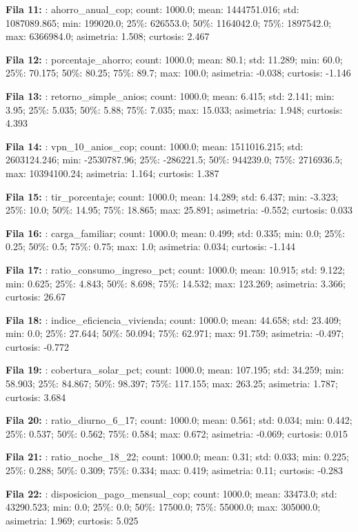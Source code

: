 {\footnotesize\textbf{Fila 11:} : ahorro\_anual\_cop; count: 1000.0; mean: 1444751.016; std: 1087089.865; min: 199020.0; 25\%: 626553.0; 50\%: 1164042.0; 75\%: 1897542.0; max: 6366984.0; asimetria: 1.508; curtosis: 2.467\par}
{\footnotesize\textbf{Fila 12:} : porcentaje\_ahorro; count: 1000.0; mean: 80.1; std: 11.289; min: 60.0; 25\%: 70.175; 50\%: 80.25; 75\%: 89.7; max: 100.0; asimetria: -0.038; curtosis: -1.146\par}
{\footnotesize\textbf{Fila 13:} : retorno\_simple\_anios; count: 1000.0; mean: 6.415; std: 2.141; min: 3.95; 25\%: 5.035; 50\%: 5.88; 75\%: 7.035; max: 15.033; asimetria: 1.948; curtosis: 4.393\par}
{\footnotesize\textbf{Fila 14:} : vpn\_10\_anios\_cop; count: 1000.0; mean: 1511016.215; std: 2603124.246; min: -2530787.96; 25\%: -286221.5; 50\%: 944239.0; 75\%: 2716936.5; max: 10394100.24; asimetria: 1.164; curtosis: 1.387\par}
{\footnotesize\textbf{Fila 15:} : tir\_porcentaje; count: 1000.0; mean: 14.289; std: 6.437; min: -3.323; 25\%: 10.0; 50\%: 14.95; 75\%: 18.865; max: 25.891; asimetria: -0.552; curtosis: 0.033\par}
{\footnotesize\textbf{Fila 16:} : carga\_familiar; count: 1000.0; mean: 0.499; std: 0.335; min: 0.0; 25\%: 0.25; 50\%: 0.5; 75\%: 0.75; max: 1.0; asimetria: 0.034; curtosis: -1.144\par}
{\footnotesize\textbf{Fila 17:} : ratio\_consumo\_ingreso\_pct; count: 1000.0; mean: 10.915; std: 9.122; min: 0.625; 25\%: 4.843; 50\%: 8.698; 75\%: 14.532; max: 123.269; asimetria: 3.366; curtosis: 26.67\par}
{\footnotesize\textbf{Fila 18:} : indice\_eficiencia\_vivienda; count: 1000.0; mean: 44.658; std: 23.409; min: 0.0; 25\%: 27.644; 50\%: 50.094; 75\%: 62.971; max: 91.759; asimetria: -0.497; curtosis: -0.772\par}
{\footnotesize\textbf{Fila 19:} : cobertura\_solar\_pct; count: 1000.0; mean: 107.195; std: 34.259; min: 58.903; 25\%: 84.867; 50\%: 98.397; 75\%: 117.155; max: 263.25; asimetria: 1.787; curtosis: 3.684\par}
{\footnotesize\textbf{Fila 20:} : ratio\_diurno\_6\_17; count: 1000.0; mean: 0.561; std: 0.034; min: 0.442; 25\%: 0.537; 50\%: 0.562; 75\%: 0.584; max: 0.672; asimetria: -0.069; curtosis: 0.015\par}
{\footnotesize\textbf{Fila 21:} : ratio\_noche\_18\_22; count: 1000.0; mean: 0.31; std: 0.033; min: 0.225; 25\%: 0.288; 50\%: 0.309; 75\%: 0.334; max: 0.419; asimetria: 0.11; curtosis: -0.283\par}
{\footnotesize\textbf{Fila 22:} : disposicion\_pago\_mensual\_cop; count: 1000.0; mean: 33473.0; std: 43290.523; min: 0.0; 25\%: 0.0; 50\%: 17500.0; 75\%: 55000.0; max: 305000.0; asimetria: 1.969; curtosis: 5.025\par}
